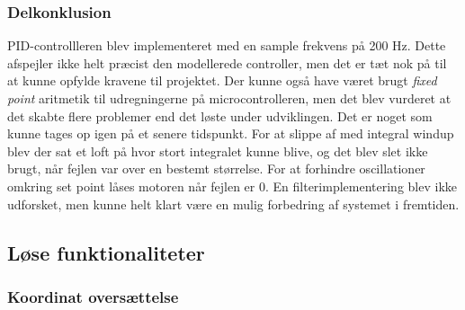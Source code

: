 \subsubsection{Delkonklusion}

PID-controllleren blev implementeret med en sample frekvens på 200 Hz. Dette afspejler ikke helt præcist den modellerede controller, men det er tæt nok på til at kunne opfylde kravene til projektet. Der kunne også have været brugt \textit{fixed point} aritmetik til udregningerne på microcontrolleren, men det blev vurderet at det skabte flere problemer end det løste under udviklingen. Det er noget som kunne tages op igen på et senere tidspunkt. For at slippe af med integral windup blev der sat et loft på hvor stort integralet kunne blive, og det blev slet ikke brugt, når fejlen var over en bestemt størrelse. For at forhindre oscillationer omkring set point låses motoren når fejlen er 0. En filterimplementering blev ikke udforsket, men kunne helt klart være en mulig forbedring af systemet i fremtiden.

\subsection{Løse funktionaliteter}

\subsubsection{Koordinat oversættelse}

